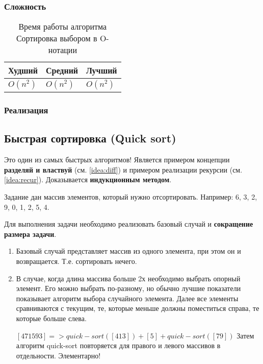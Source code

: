 		\subsubsection{Сложность}
		
\begin{table}[h!]
\caption{Время работы алгоритма Сортировка выбором в O-нотации}
\begin{tabular}{|l|l|l|}
\hline
Худший & Средний & Лучший \\ \hline
$ O(n^{2}) $ & $ O(n^{2}) $ & $ O(n^{2}) $ \\\hline
\end{tabular}
\end{table}

		\subsubsection{Реализация}
		
\linenumbers
{}
\nolinenumbers	

		\subsection{Быстрая сортировка (Quick sort) \label{sort:quick}}
		Это один из самых быстрых алгоритмов! Является примером концепции \textbf{разделяй и властвуй} (см. \ref{idea:diff}) и примером реализации рекурсии (см. \ref{idea:recur}). Доказывается \textbf{индукционным методом}.
		
		Задание дан массив элементов, который нужно отсортировать. Например: 6, 3, 2, 9, 0, 1, 2, 5, 4.
		
		Для выполнения задачи необходимо реализовать базовый случай и \textbf{сокращение размера задачи}. 
		\begin{enumerate}
		\item Базовый случай представляет массив из одного элемента, при этом он и возвращается. Т.е. сортировать нечего.
		\item В случае, когда длина массива больше 2х необходимо выбрать опорный элемент. Его можно выбрать по-разному, но обычно лучшие показатели показывает алгоритм выбора случайного элемента. Далее все элементы сравниваются с текущим, те, которые меньше должны поместиться справа, те которые больше слева.
		
		$ [4 7 1 5 9 3] => quick-sort([4 1 3]) + [5] + quick-sort([7 9]) $
		Затем алгоритм quick-sort повторяется для правого и левого массивов в отдельности. Элементарно!
		\end{enumerate}

